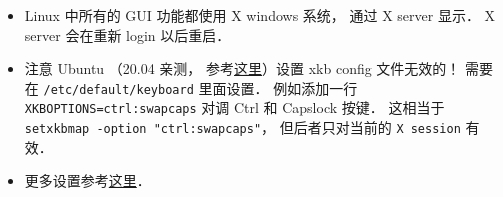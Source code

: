 
\begin{itemize}
\item Linux 中所有的 GUI 功能都使用 X windows 系统， 通过 X server 显示． X server 会在重新 login 以后重启．
\item 注意 Ubuntu （20.04 亲测， 参考\href{https://manpages.ubuntu.com/manpages/focal/en/man5/keyboard.5.html}{这里}）设置 xkb config 文件无效的！ 需要在 \verb|/etc/default/keyboard| 里面设置． 例如添加一行 \verb|XKBOPTIONS=ctrl:swapcaps| 对调 Ctrl 和 Capslock 按键． 这相当于 \verb|setxkbmap -option "ctrl:swapcaps"|， 但后者只对当前的 \verb|X session| 有效．
\item 更多设置参考\href{https://gist.github.com/jatcwang/ae3b7019f219b8cdc6798329108c9aee}{这里}．
\end{itemize}
